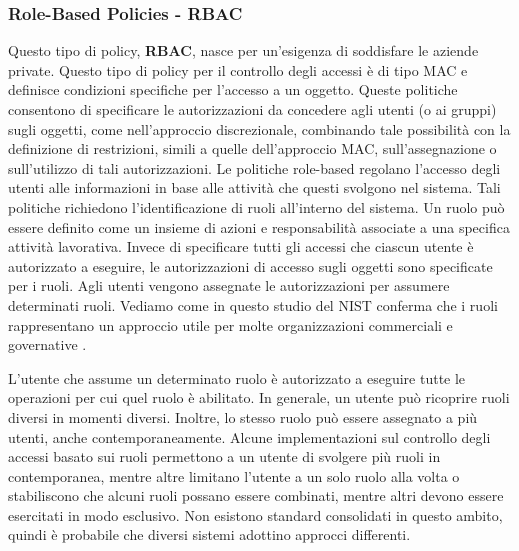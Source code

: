        \subsubsection{Role-Based Policies - RBAC}
            Questo tipo di policy, \textbf{RBAC}, nasce per un'esigenza di soddisfare le aziende private. Questo tipo di policy per il controllo degli accessi è di tipo MAC e definisce condizioni specifiche per l'accesso a un oggetto.
                Queste politiche consentono di specificare le autorizzazioni da concedere agli utenti (o ai gruppi) sugli oggetti, come nell'approccio discrezionale, combinando tale possibilità con la definizione di restrizioni, simili a quelle dell'approccio MAC, sull'assegnazione o sull'utilizzo di tali autorizzazioni. Le politiche role-based regolano l'accesso degli utenti alle informazioni in base alle attività che questi svolgono nel sistema. Tali politiche richiedono l'identificazione di ruoli all'interno del sistema. Un ruolo può essere definito come un insieme di azioni e responsabilità associate a una specifica attività lavorativa. Invece di specificare tutti gli accessi che ciascun utente è autorizzato a eseguire, le autorizzazioni di accesso sugli oggetti sono specificate per i ruoli. Agli utenti vengono assegnate le autorizzazioni per assumere determinati ruoli. Vediamo come in questo studio del NIST conferma che i ruoli rappresentano un approccio utile per molte organizzazioni commerciali e governative \cite{nist_study_rbac}.

                L'utente che assume un determinato ruolo è autorizzato a eseguire tutte le operazioni per cui quel ruolo è abilitato. In generale, un utente può ricoprire ruoli diversi in momenti diversi. Inoltre, lo stesso ruolo può essere assegnato a più utenti, anche contemporaneamente. Alcune implementazioni sul controllo degli accessi basato sui ruoli permettono a un utente di svolgere più ruoli in contemporanea, mentre altre limitano l'utente a un solo ruolo alla volta o stabiliscono che alcuni ruoli possano essere combinati, mentre altri devono essere esercitati in modo esclusivo. Non esistono standard consolidati in questo ambito, quindi è probabile che diversi sistemi adottino approcci differenti.

